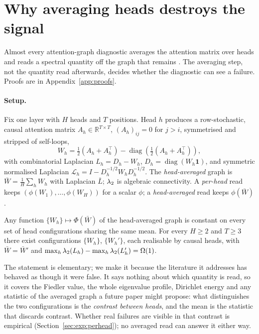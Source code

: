 \section{Why averaging heads destroys the signal}
\label{sec:theory}

Almost every attention-graph diagnostic averages the attention matrix over heads and reads a spectral
quantity off the graph that remains \citep{noel2025gsp,li2025hsad,badash2026layers}. The averaging step, not
the quantity read afterwards, decides whether the diagnostic can see a failure. Proofs are in
Appendix~\ref{app:proofs}.

\paragraph{Setup.}
\label{sec:theory:setup}
Fix one layer with $H$ heads and $T$ positions. Head $h$ produces a row-stochastic, causal attention matrix
$A_h \in \mathbb{R}^{T\times T}$, $(A_h)_{ij}=0$ for $j>i$, symmetrised and stripped of self-loops,
\begin{equation}
W_h = \tfrac{1}{2}\left(A_h + A_h^{\top}\right) - \operatorname{diag}\!\left(\tfrac{1}{2}(A_h + A_h^{\top})\right),
\label{eq:adj}
\end{equation}
with combinatorial Laplacian $L_h = D_h - W_h$, $D_h=\operatorname{diag}(W_h\mathbf{1})$, and symmetric
normalised Laplacian $\mathcal{L}_h = I - D_h^{-1/2}W_hD_h^{-1/2}$. The \emph{head-averaged} graph is
$\bar W = \frac1H\sum_h W_h$ with Laplacian $\bar L$; $\lambda_{2}$ is algebraic connectivity. A \emph{per-head}
read keeps $(\phi(W_1),\dots,\phi(W_H))$ for a scalar $\phi$; a \emph{head-averaged} read keeps $\phi(\bar W)$.

\begin{proposition}[annihilation]
\label{prop:annihilation}
Any function $\{W_h\}\mapsto\Phi(\bar W)$ of the head-averaged graph is constant on every set of head
configurations sharing the same mean. For every $H\ge 2$ and $T\ge 3$ there exist configurations
$\{W_h\}$, $\{W_h'\}$, each realisable by causal heads, with $\bar W=\bar W'$ and
$\max_h\lambda_{2}(L_h)-\max_h\lambda_{2}(L_h')=\Omega(1)$.
\end{proposition}
\label{sec:theory:annihilation}

The statement is elementary; we make it because the literature it addresses has behaved as though it were
false. It says nothing about which quantity is read, so it covers the Fiedler value, the whole eigenvalue
profile, Dirichlet energy and any statistic of the averaged graph a future paper might propose: what
distinguishes the two configurations is the \emph{contrast between heads}, and the mean is the statistic that
discards contrast. Whether real failures are visible in that contrast is empirical
(Section~\ref{sec:exp:perhead}); no averaged read can answer it either way.

